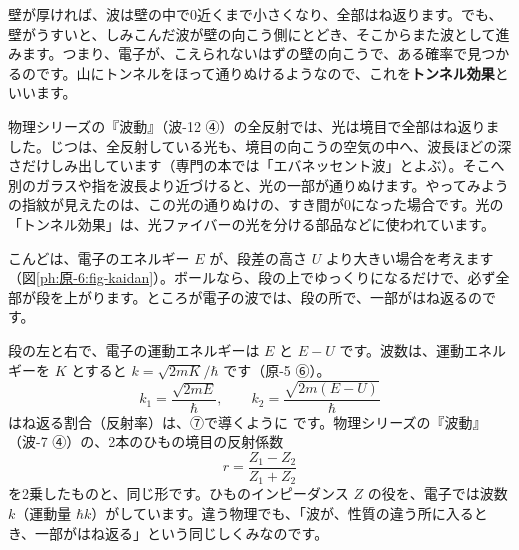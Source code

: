 \noindent 壁が厚ければ、波は壁の中で0近くまで小さくなり、全部はね返ります。でも、壁がうすいと、しみこんだ波が壁の向こう側にとどき、そこからまた波として進みます。つまり、電子が、こえられないはずの壁の向こうで、ある確率で見つかるのです。山にトンネルをほって通りぬけるようなので、これを\textbf{トンネル効果}といいます。

\begin{phmijika}[光も、全反射の境目の向こうへしみ出す]
物理シリーズの『波動』（波-12 ④）の全反射では、光は境目で全部はね返りました。じつは、全反射している光も、境目の向こうの空気の中へ、波長ほどの深さだけしみ出しています（専門の本では「エバネッセント波」とよぶ）。そこへ別のガラスや指を波長より近づけると、光の一部が通りぬけます。やってみようの指紋が見えたのは、この光の通りぬけの、すき間が0になった場合です。光の「トンネル効果」は、光ファイバーの光を分ける部品などに使われています。
\end{phmijika}

\label{ph:原-6:sec2}
こんどは、電子のエネルギー $E$ が、段差の高さ $U$ より大きい場合を考えます（図\ref{ph:原-6:fig-kaidan}）。ボールなら、段の上でゆっくりになるだけで、必ず全部が段を上がります。ところが電子の波では、段の所で、一部がはね返るのです。

\noindent 段の左と右で、電子の運動エネルギーは $E$ と $E-U$ です。波数は、運動エネルギーを $K$ とすると $k=\sqrt{2mK}/\hbar$ です（原-5 ⑥）。
\[k_1=\frac{\sqrt{2mE}}{\hbar},\qquad k_2=\frac{\sqrt{2m(E-U)}}{\hbar}\]
はね返る割合（反射率）は、⑦で導くように
\label{ph:原-6:hansha}です。物理シリーズの『波動』（波-7 ④）の、2本のひもの境目の反射係数
\[r=\frac{Z_1-Z_2}{Z_1+Z_2}\]
を2乗したものと、同じ形です。ひものインピーダンス $Z$ の役を、電子では波数 $k$（運動量 $\hbar k$）がしています。違う物理でも、「波が、性質の違う所に入るとき、一部がはね返る」という同じしくみなのです。

